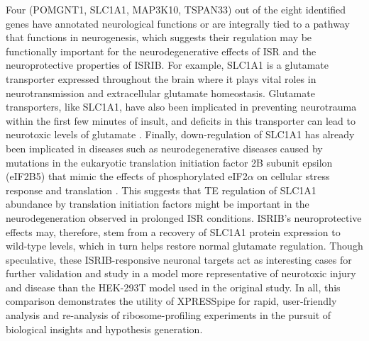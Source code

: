 \documentclass[10pt, oneside]{article}
\begin{document}
Four (POMGNT1, SLC1A1, MAP3K10, TSPAN33) out of the eight identified genes have annotated neurological functions or are integrally tied to a pathway that functions in neurogenesis, which suggests their regulation may be functionally important for the neurodegenerative effects of ISR and the neuroprotective properties of ISRIB. For example, SLC1A1 is a glutamate transporter expressed throughout the brain where it plays vital roles in neurotransmission and extracellular glutamate homeostasis. Glutamate transporters, like SLC1A1, have also been implicated in preventing neurotrauma within the first few minutes of insult, and deficits in this transporter can lead to neurotoxic levels of glutamate \cite{slc1a1_neurotoxic}. Finally, down-regulation of SLC1A1 has already been implicated in diseases such as neurodegenerative diseases caused by mutations in the eukaryotic translation initiation factor 2B subunit epsilon (eIF2B5) that mimic the effects of phosphorylated eIF2$\alpha$ on cellular stress response and translation \cite{eif2b_neuroprotective, isrib_riboseq, isrib_structure}. This suggests that TE regulation of SLC1A1 abundance by translation initiation factors might be important in the neurodegeneration observed in prolonged ISR conditions. ISRIB's neuroprotective effects may, therefore, stem from a recovery of SLC1A1 protein expression to wild-type levels, which in turn helps restore normal glutamate regulation. Though speculative, these ISRIB-responsive neuronal targets act as interesting cases for further validation and study in a model more representative of neurotoxic injury and disease than the HEK-293T model used in the original study. In all, this comparison demonstrates the utility of XPRESSpipe for rapid, user-friendly analysis and re-analysis of ribosome-profiling experiments in the pursuit of biological insights and hypothesis generation. \par
\end{document}
